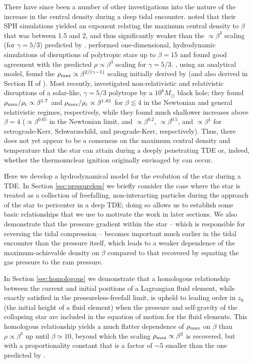\documentclass[twocolumn]{aastex62}
\begin{document}
There have since been a number of other investigations into the nature of the increase in the central density during a deep tidal encounter. \citet{laguna93} noted that their SPH simulations yielded an exponent relating the maximum central density to $\beta$ that was between 1.5 and 2, and thus significantly weaker than the $\propto \beta^3$ scaling (for $\gamma = 5/3$) predicted by \citet{carter83}. \citet{brassart08} performed one-dimensional, hydrodynamic simulations of disruptions of polytropic stars up to $\beta = 15$ and found good agreement with the predicted $\rho \propto \beta^3$ scaling for $\gamma = 5/3$. \citet{Stone:2013aa}, using an analytical model, found the $\rho_{\rm max} \propto \beta^{2/(\gamma-1)}$ scaling initially derived by \citet{carter83} (and also derived in Section II of \citealt{Bicknell:1983aa}). {}{Most recently, \citet{gafton19} investigated non-relativistic and relativistic disruptions of a solar-like, $\gamma=5/3$ polytrope by a $10^{6}M_{\odot}$ black hole; they found $\rho_{\rm max}/\rho_{\rm c} \propto \beta^{1.7}$ and $\rho_{\rm max}/\rho_{\rm c} \propto \beta^{1.85}$ for $\beta \lesssim 4$ in the Newtonian and general relativistic regimes, respectively, while they found much shallower increases above $\beta = 4$ ($\propto \beta^{0.65}$ in the Newtonian limit, and $\propto \beta ^{0.2}$, $\propto \beta^{0.5}$, and $\propto \beta^{1}$ for retrograde-Kerr, Schwarzschild, and prograde-Kerr, respectively).} Thus, there does not yet appear to be a consensus on the maximum central density and temperature that the star can attain during a deeply penetrating TDE or, indeed, whether the thermonuclear ignition originally envisaged by \citet{carter83} can occur. 

Here we develop a hydrodynamical model for the evolution of the star during a TDE. In Section \ref{sec:pressureless} we briefly consider the case where the star is treated as a collection of freefalling, non-interacting particles during the approach of the star to pericenter in a deep TDE; doing so allows us to establish some basic relationships that we use to motivate the work in later sections. We also demonstrate that the {pressure gradient} within the star -- which is responsible for reversing the tidal compression -- becomes important much earlier in the tidal encounter than the pressure itself, which leads to a weaker dependence of the maximum-achievable density on $\beta$ compared to that recovered by equating the gas pressure to the ram pressure. 

In Section \ref{sec:homologous} we demonstrate that a homologous relationship between the current and initial positions of a Lagrangian fluid element, while exactly satisfied in the pressureless-freefall limit, is upheld to leading order in $z_0$ (the initial height of a fluid element) when the pressure and self-gravity of the collapsing star are included in the equation of motion for the fluid elements. This homologous relationship yields a much flatter dependence of $\rho_{\rm max}$ on $\beta$ than $\rho \propto \beta^{3}$ up until $\beta \simeq 10$, beyond which the scaling $\rho_{\rm max} \propto \beta^3$ is recovered, but with a proportionality constant that is a factor of $\sim 5$ smaller than the one predicted by \citet{luminet86}.
\end{document}
